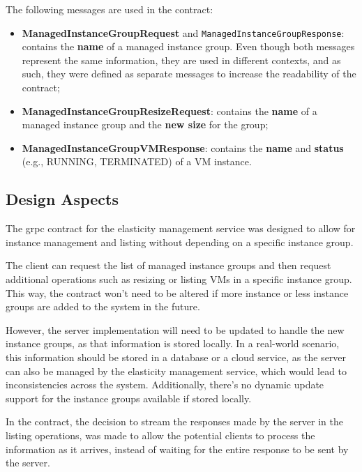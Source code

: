 The following messages are used in the contract:

\begin{itemize}
    \item \textbf{ManagedInstanceGroupRequest} and \texttt{ManagedInstanceGroupResponse}:
    contains the \textbf{name} of a managed instance group.
    Even though both messages represent the same information, they are used in different contexts,
    and as such, they were defined as separate messages to increase the readability of the contract;
    \item \textbf{ManagedInstanceGroupResizeRequest}:
    contains the \textbf{name} of a managed instance group and the \textbf{new size} for the group;
    \item \textbf{ManagedInstanceGroupVMResponse}: contains the \textbf{name} and \textbf{status} (e.g., RUNNING, TERMINATED) of a VM instance.
\end{itemize}

\subsection{Design Aspects}\label{subsec:elasticity-management-design-aspects}

The grpc contract for the elasticity management service was designed
to allow for instance management and listing without depending on a specific instance group.

The client can request the list of managed instance groups and then request additional operations such as resizing or listing VMs in a specific instance group.
This way, the contract won't need to be altered if more instance or less instance groups are added to the system in the future.

However, the server implementation will need to be updated to handle the new instance groups,
as that information is stored locally.
In a real-world scenario, this information should be stored in a database or a cloud service, as the server can also be managed by the elasticity management service,
which would lead to inconsistencies across the system.
Additionally, there's no dynamic update support for the instance groups available if stored locally.

In the contract, the decision to stream the responses made by the server in the listing operations,
was made to allow the potential clients to process the information as it arrives,
instead of waiting for the entire response to be sent by the server.
